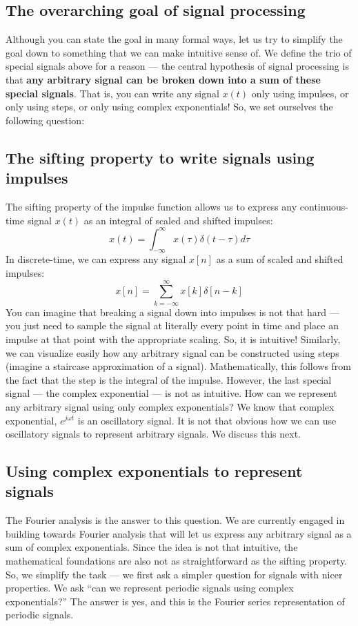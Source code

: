 \documentclass{ee102_notes}
\begin{document}
\subsection{The overarching goal of signal processing}
Although you can state the goal in many formal ways, let us try to simplify the goal down to something that we can make intuitive sense of. We define the trio of special signals above for a reason --- the central hypothesis of signal processing is that \textbf{any arbitrary signal can be broken down into a sum of these special signals}. That is, you can write any signal $x(t)$ only using impulses, or only using steps, or only using complex exponentials! So, we set ourselves the following question:

\begin{center}\end{center}

\subsection{The sifting property to write signals using impulses}
The sifting property of the impulse function allows us to express any continuous-time signal $x(t)$ as an integral of scaled and shifted impulses:
\[
x(t) = \int_{-\infty}^{\infty} x(\tau) \delta(t - \tau) d\tau
\]
In discrete-time, we can express any signal $x[n]$ as a sum of scaled and shifted impulses:
\[
x[n] = \sum_{k=-\infty}^{\infty} x[k] \delta[n - k]
\]
 You can imagine that breaking a signal down into impulses is not that hard --- you just need to sample the signal at literally every point in time and place an impulse at that point with the appropriate scaling. So, it is intuitive! Similarly, we can visualize easily how any arbitrary signal can be constructed using steps (imagine a staircase approximation of a signal). Mathematically, this follows from the fact that the step is the integral of the impulse. However, the last special signal --- the complex exponential --- is not as intuitive. How can we represent any arbitrary signal using only complex exponentials? We know that complex exponential, $e^{j \omega t}$ is an oscillatory signal. It is not that obvious how we can use oscillatory signals to represent arbitrary signals. We discuss this next.
\subsection{Using complex exponentials to represent signals}
The Fourier analysis is the answer to this question. We are currently engaged in building towards Fourier analysis that will let us express any arbitrary signal as a sum of complex exponentials. Since the idea is not that intuitive, the mathematical foundations are also not as straightforward as the sifting property. So, we simplify the task --- we first ask a simpler question for signals with nicer properties. We ask ``can we represent periodic signals using complex exponentials?'' The answer is yes, and this is the Fourier series representation of periodic signals. 
\end{document}
